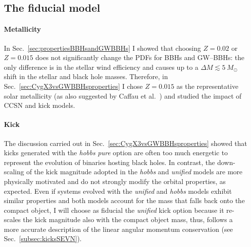 \documentclass[a4paper,titlepage]{book}     	%
\newcommand{\sun}{\ensuremath{_\odot}}
\newcommand{\msun}{\ensuremath{M\sun}}
\begin{document}
\subsection{The fiducial model}\label{subsec:fiducialCygX3}
\paragraph{Metallicity} In Sec.\ \ref{sec:propertiesBBHsandGWBBHs} I showed that choosing $Z=0.02$ or $Z=0.015$ does not significantly change the PDFs for BBHs and GW--BBHs: the only difference is in the stellar wind efficiency and causes up to a $\Delta M \lesssim 5~\msun$ shift in the stellar and black hole masses. Therefore, in Sec.\ \ref{sec:CygX3vsGWBBHsproperties} I chose $Z=0.015$ as the representative solar metallicity (as also suggested by Caffau et al.\ \cite{caffau2011solarmetallicity}) and studied the impact of CCSN and kick models.

\paragraph{Kick} The discussion carried out in Sec.\ \ref{sec:CygX3vsGWBBHsproperties} showed that kicks generated with the \emph{hobbs pure} option are often too much energetic to represent the evolution of binaries hosting black holes. In contrast, the down-scaling of the kick magnitude adopted in the \emph{hobbs} and \emph{unified} models are more physically motivated and do not strongly modify the orbital properties, as expected. Even if systems evolved with the \emph{unified} and \emph{hobbs} models exhibit similar properties and both models account for the mass that falls back onto the compact object, I will choose as fiducial the \emph{unified} kick option because it re-scales the kick magnitude also with the compact object mass, thus, follows a more accurate description of the linear angular momentum conservation (see Sec.\ \ref{subsec:kicksSEVN}).
\end{document}
